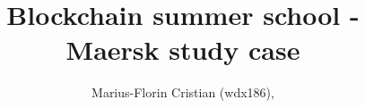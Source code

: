 \documentclass[a4paper]{article}
\begin{document}
\title{\vspace{-4cm}Blockchain summer school - Maersk study case}
\author{Marius-Florin Cristian (wdx186),  }

\maketitle




\end{document}
